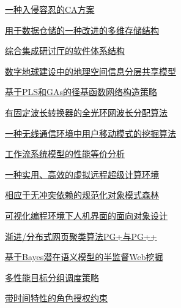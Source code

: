 \documentclass[a4paper]{article}
\begin{document}
\href{http://www.jos.org.cn/ch/reader/download_pdf.aspx?file_no=20020810&year_id=2002&quarter_id=8&falg=1}{一种入侵容忍的CA方案}

\href{http://www.jos.org.cn/ch/reader/download_pdf.aspx?file_no=20020811&year_id=2002&quarter_id=8&falg=1}{用于数据仓储的一种改进的多维存储结构}

\href{http://www.jos.org.cn/ch/reader/download_pdf.aspx?file_no=20020812&year_id=2002&quarter_id=8&falg=1}{综合集成研讨厅的软件体系结构}

\href{http://www.jos.org.cn/ch/reader/download_pdf.aspx?file_no=20020813&year_id=2002&quarter_id=8&falg=1}{数字地球建设中的地理空间信息分层共享模型}

\href{http://www.jos.org.cn/ch/reader/download_pdf.aspx?file_no=20020815&year_id=2002&quarter_id=8&falg=1}{基于PLS和GAs的径基函数网络构造策略}

\href{http://www.jos.org.cn/ch/reader/download_pdf.aspx?file_no=20020816&year_id=2002&quarter_id=8&falg=1}{有固定波长转换器的全光环网波长分配算法}

\href{http://www.jos.org.cn/ch/reader/download_pdf.aspx?file_no=20020817&year_id=2002&quarter_id=8&falg=1}{一种无线通信环境中用户移动模式的挖掘算法}

\href{http://www.jos.org.cn/ch/reader/download_pdf.aspx?file_no=20020818&year_id=2002&quarter_id=8&falg=1}{工作流系统模型的性能等价分析}

\href{http://www.jos.org.cn/ch/reader/download_pdf.aspx?file_no=20020819&year_id=2002&quarter_id=8&falg=1}{一种实用、高效的虚拟远程超级计算环境}

\href{http://www.jos.org.cn/ch/reader/download_pdf.aspx?file_no=20020820&year_id=2002&quarter_id=8&falg=1}{相应于无冲突依赖的规范化对象模式森林}

\href{http://www.jos.org.cn/ch/reader/download_pdf.aspx?file_no=20020821&year_id=2002&quarter_id=8&falg=1}{可视化编程环境下人机界面的面向对象设计}

\href{http://www.jos.org.cn/ch/reader/download_pdf.aspx?file_no=20020822&year_id=2002&quarter_id=8&falg=1}{渐进/分布式网页聚类算法PG+与PG++}

\href{http://www.jos.org.cn/ch/reader/download_pdf.aspx?file_no=20020823&year_id=2002&quarter_id=8&falg=1}{基于Bayes潜在语义模型的半监督Web挖掘}

\href{http://www.jos.org.cn/ch/reader/download_pdf.aspx?file_no=20020824&year_id=2002&quarter_id=8&falg=1}{多性能目标分组调度策略}

\href{http://www.jos.org.cn/ch/reader/download_pdf.aspx?file_no=20020825&year_id=2002&quarter_id=8&falg=1}{带时间特性的角色授权约束}
\end{document}
